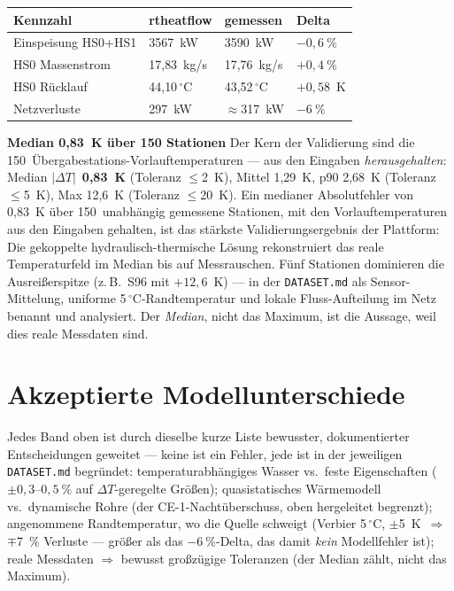 \documentclass[11pt,a4paper,parskip=half]{scrreprt}
\newcommand{\gC}{\,\ensuremath{{}^{\circ}\mathrm{C}}}
\newenvironment{beispiel}[1][Beispiel]
  {\par\medskip{\color{bsp}\hrule height 0.8pt}\nopagebreak\smallskip
   \noindent\textbf{\textsf{\textcolor{bsp}{#1}}}\quad\ignorespaces}
  {\par\nopagebreak\smallskip{\color{bsp}\hrule height 0.8pt}\par\medskip}
\begin{document}
{\small
\begin{center}
\begin{tabular}{@{}llll@{}}
\toprule
Kennzahl & rtheatflow & gemessen & Delta \\
\midrule
Einspeisung HS0+HS1 & 3567~kW    & 3590~kW    & $-0{,}6~\%$ \\
HS0 Massenstrom     & 17{,}83~kg/s & 17{,}76~kg/s & $+0{,}4~\%$ \\
HS0 Rücklauf        & 44{,}10\gC  & 43{,}52\gC  & $+0{,}58$~K \\
Netzverluste        & 297~kW     & $\approx$317~kW & $-6~\%$ \\
\bottomrule
\end{tabular}
\end{center}}

\begin{beispiel}[Median 0{,}83~K über 150 Stationen]
Der Kern der Validierung sind die 150~Übergabestations-Vorlauftemperaturen ---
aus den Eingaben \emph{herausgehalten}: Median $|\Delta T|$~\textbf{0{,}83~K}
(Toleranz $\leq$2~K), Mittel 1{,}29~K, p90 2{,}68~K (Toleranz $\leq$5~K), Max
12{,}6~K (Toleranz $\leq$20~K). Ein medianer Absolutfehler von 0{,}83~K über
150~unabhängig gemessene Stationen, mit den Vorlauftemperaturen aus den
Eingaben gehalten, ist das stärkste Validierungsergebnis der Plattform: Die
gekoppelte hydraulisch-thermische Lösung rekonstruiert das reale Temperaturfeld
im Median bis auf Messrauschen. Fünf Stationen dominieren die Ausreißerspitze
(z.\,B.\ S96 mit $+12{,}6$~K) --- in der \texttt{DATASET.md} als
Sensor-Mittelung, uniforme 5\gC-Randtemperatur und lokale Fluss-Aufteilung im
Netz benannt und analysiert. Der \emph{Median}, nicht das Maximum, ist die
Aussage, weil dies reale Messdaten sind.
\end{beispiel}

\section{Akzeptierte Modellunterschiede}

Jedes Band oben ist durch dieselbe kurze Liste bewusster, dokumentierter
Entscheidungen geweitet --- keine ist ein Fehler, jede ist in der jeweiligen
\texttt{DATASET.md} begründet: temperaturabhängiges Wasser vs.\ feste
Eigenschaften ($\pm0{,}3$--$0{,}5~\%$ auf $\Delta T$-geregelte Größen);
quasistatisches Wärmemodell vs.\ dynamische Rohre (der CE-1-Nachtüberschuss,
oben hergeleitet begrenzt); angenommene Randtemperatur, wo die Quelle schweigt
(Verbier 5\gC, $\pm$5~K~$\Rightarrow$~$\mp$7~\% Verluste --- größer als das
$-6~\%$-Delta, das damit \emph{kein} Modellfehler ist); reale Messdaten
$\Rightarrow$ bewusst großzügige Toleranzen (der Median zählt, nicht das Maximum).
\end{document}
